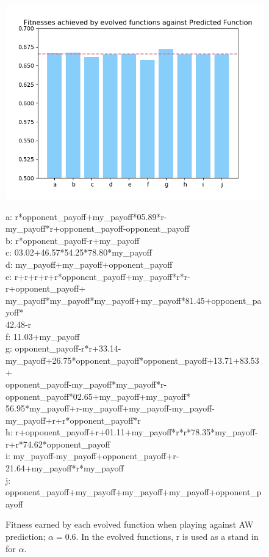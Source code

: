 \documentclass[11pt]{book}
\begin{document}
\begin{figure}
	\centering
	\includegraphics[scale=0.7]{resources/ylim_barchart_fitness_earned_against_target_r_06.png}
	{\tiny
		\begin{flalign*}
			a: r*opponent\_payoff+my\_payoff*05.89*r-my\_payoff*r+opponent\_payoff-opponent\_payoff\\
			b: r*opponent\_payoff-r+my\_payoff\\
			c: 03.02+46.57*54.25*78.80*my\_payoff\\
			d: my\_payoff+my\_payoff+opponent\_payoff\\
			e: r+r+r+r+r*opponent\_payoff+my\_payoff*r*r-r+opponent\_payoff+\\my\_payoff*my\_payoff*my\_payoff+my\_payoff*81.45+opponent\_payoff*\\42.48-r\\
			f: 11.03+my\_payoff\\
			g: opponent\_payoff-r*r+33.14-my\_payoff+26.75*opponent\_payoff*opponent\_payoff+13.71+83.53+\\opponent\_payoff-my\_payoff*my\_payoff*r-opponent\_payoff*02.65+my\_payoff+my\_payoff*\\56.95*my\_payoff+r-my\_payoff+my\_payoff-my\_payoff-my\_payoff+r+r*opponent\_payoff*r\\
			h: r+opponent\_payoff+r+01.11+my\_payoff*r*r*78.35*my\_payoff-r+r*74.62*opponent\_payoff\\
			i: my\_payoff-my\_payoff+opponent\_payoff+r-21.64+my\_payoff*r*my\_payoff\\
			j: opponent\_payoff+my\_payoff+my\_payoff+my\_payoff+opponent\_payoff\\
		\end{flalign*}
	}%
	\caption{Fitness earned by each evolved function when playing against AW prediction; $\alpha = 0.6$. In the evolved functions, r is used as a stand in for $\alpha$.}
	\label{barchart_fitness_earned_against_target_r06}
\end{figure}
\end{document}

